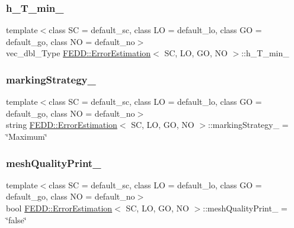 \mbox{\label{classFEDD_1_1ErrorEstimation_a641cf149d34e2423bf9cbba020cb234a}} 
\subsubsection{\texorpdfstring{h\+\_\+\+T\+\_\+min\+\_\+}{h\_T\_min\_}}
{\footnotesize\ttfamily template$<$class SC = default\+\_\+sc, class LO = default\+\_\+lo, class GO = default\+\_\+go, class NO = default\+\_\+no$>$ \\
vec\+\_\+dbl\+\_\+\+Type \hyperlink{classFEDD_1_1ErrorEstimation}{F\+E\+D\+D\+::\+Error\+Estimation}$<$ SC, LO, GO, NO $>$\+::h\+\_\+\+T\+\_\+min\+\_\+\hspace{0.3cm}{\ttfamily [protected]}}

\mbox{\label{classFEDD_1_1ErrorEstimation_a235e923a33a175e7d884e1a2a6e0c7ec}} 
\subsubsection{\texorpdfstring{marking\+Strategy\+\_\+}{markingStrategy\_}}
{\footnotesize\ttfamily template$<$class SC = default\+\_\+sc, class LO = default\+\_\+lo, class GO = default\+\_\+go, class NO = default\+\_\+no$>$ \\
string \hyperlink{classFEDD_1_1ErrorEstimation}{F\+E\+D\+D\+::\+Error\+Estimation}$<$ SC, LO, GO, NO $>$\+::marking\+Strategy\+\_\+ = \char`\"{}Maximum\char`\"{}}

\mbox{\label{classFEDD_1_1ErrorEstimation_a2db28f9a5cd90b6bb3abba15ed4ed7f0}} 
\subsubsection{\texorpdfstring{mesh\+Quality\+Print\+\_\+}{meshQualityPrint\_}}
{\footnotesize\ttfamily template$<$class SC = default\+\_\+sc, class LO = default\+\_\+lo, class GO = default\+\_\+go, class NO = default\+\_\+no$>$ \\
bool \hyperlink{classFEDD_1_1ErrorEstimation}{F\+E\+D\+D\+::\+Error\+Estimation}$<$ SC, LO, GO, NO $>$\+::mesh\+Quality\+Print\+\_\+ = \char`\"{}false\char`\"{}}

